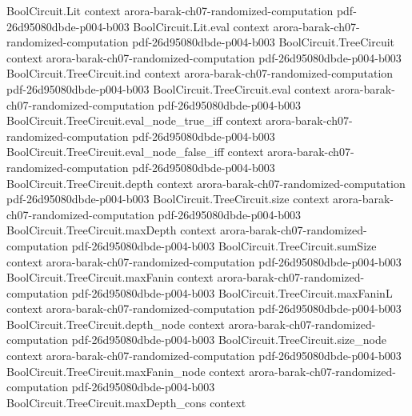\begin{theorem}
\label{Randomized.inBPP_PRIMESBin}
\leanok
{}
\proofstep
  {BoolCircuit.Lit}
  {context}
  {arora-barak-ch07-randomized-computation}
  {pdf-26d95080dbde-p004-b003}
\proofstep
  {BoolCircuit.Lit.eval}
  {context}
  {arora-barak-ch07-randomized-computation}
  {pdf-26d95080dbde-p004-b003}
\proofstep
  {BoolCircuit.TreeCircuit}
  {context}
  {arora-barak-ch07-randomized-computation}
  {pdf-26d95080dbde-p004-b003}
\proofstep
  {BoolCircuit.TreeCircuit.ind}
  {context}
  {arora-barak-ch07-randomized-computation}
  {pdf-26d95080dbde-p004-b003}
\proofstep
  {BoolCircuit.TreeCircuit.eval}
  {context}
  {arora-barak-ch07-randomized-computation}
  {pdf-26d95080dbde-p004-b003}
\proofstep
  {BoolCircuit.TreeCircuit.eval_node_true_iff}
  {context}
  {arora-barak-ch07-randomized-computation}
  {pdf-26d95080dbde-p004-b003}
\proofstep
  {BoolCircuit.TreeCircuit.eval_node_false_iff}
  {context}
  {arora-barak-ch07-randomized-computation}
  {pdf-26d95080dbde-p004-b003}
\proofstep
  {BoolCircuit.TreeCircuit.depth}
  {context}
  {arora-barak-ch07-randomized-computation}
  {pdf-26d95080dbde-p004-b003}
\proofstep
  {BoolCircuit.TreeCircuit.size}
  {context}
  {arora-barak-ch07-randomized-computation}
  {pdf-26d95080dbde-p004-b003}
\proofstep
  {BoolCircuit.TreeCircuit.maxDepth}
  {context}
  {arora-barak-ch07-randomized-computation}
  {pdf-26d95080dbde-p004-b003}
\proofstep
  {BoolCircuit.TreeCircuit.sumSize}
  {context}
  {arora-barak-ch07-randomized-computation}
  {pdf-26d95080dbde-p004-b003}
\proofstep
  {BoolCircuit.TreeCircuit.maxFanin}
  {context}
  {arora-barak-ch07-randomized-computation}
  {pdf-26d95080dbde-p004-b003}
\proofstep
  {BoolCircuit.TreeCircuit.maxFaninL}
  {context}
  {arora-barak-ch07-randomized-computation}
  {pdf-26d95080dbde-p004-b003}
\proofstep
  {BoolCircuit.TreeCircuit.depth_node}
  {context}
  {arora-barak-ch07-randomized-computation}
  {pdf-26d95080dbde-p004-b003}
\proofstep
  {BoolCircuit.TreeCircuit.size_node}
  {context}
  {arora-barak-ch07-randomized-computation}
  {pdf-26d95080dbde-p004-b003}
\proofstep
  {BoolCircuit.TreeCircuit.maxFanin_node}
  {context}
  {arora-barak-ch07-randomized-computation}
  {pdf-26d95080dbde-p004-b003}
\proofstep
  {BoolCircuit.TreeCircuit.maxDepth_cons}
  {context}

\end{theorem}
